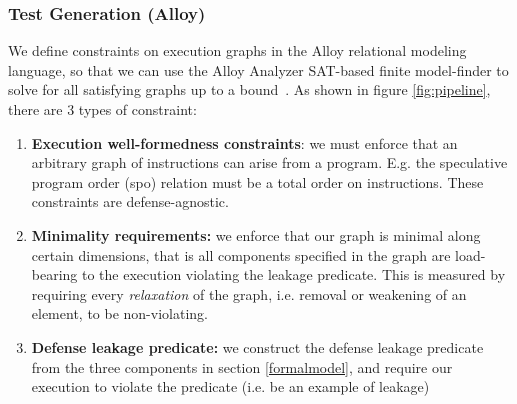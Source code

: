 \subsubsection{Test Generation (Alloy)}
We define constraints on execution graphs in the Alloy relational modeling language, so that we can use the Alloy Analyzer SAT-based finite model-finder to solve for all satisfying graphs up to a bound~\cite{jackson2002alloy}. As shown in figure \ref{fig:pipeline}, there are 3 types of constraint:
\urgentbr
{}
\notebr
\begin{enumerate}
    \item \textbf{Execution well-formedness constraints}: we must enforce that an arbitrary graph of instructions can arise from a program. E.g. the speculative program order (spo) relation must be a total order on instructions. These constraints are defense-agnostic.
\notebr
    \item \textbf{Minimality requirements:} we enforce that our graph is minimal along certain dimensions, that is all components specified in the graph are load-bearing to the execution violating the leakage predicate. This is measured by requiring every \textit{relaxation} of the graph, i.e. removal or weakening of an element, to be non-violating.
\notebr
{}
\notebr
    \item \textbf{Defense leakage predicate:} we construct the defense leakage predicate from the three components in section \ref{formalmodel}, and require our execution to violate the predicate (i.e. be an example of leakage)
\notebr
\end{enumerate}
